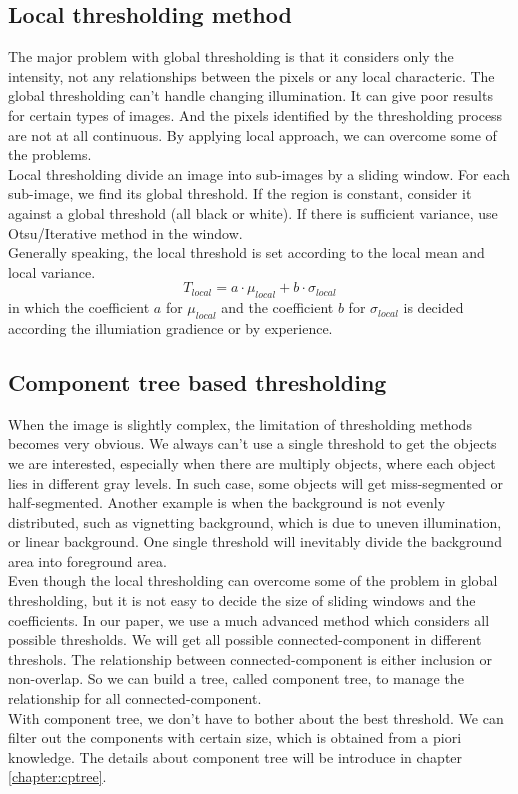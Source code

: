 \subsection{Local thresholding method}
The major problem with global thresholding is that it considers only the intensity, not any relationships between the pixels or any local characteric. The global thresholding can't handle changing illumination. It can give poor results for certain types of images. And the pixels identified by the thresholding process are not at all continuous. By applying local approach, we can overcome some of the problems.\\
Local thresholding divide an image into sub-images by a sliding window. For each sub-image, we find its global threshold. If the region is constant, consider it against a global threshold (all black or white). If there is sufficient variance, use Otsu/Iterative method in the window. \\
Generally speaking, the local threshold is set according to the local mean and local variance.
$$
T_{local} = a\cdot\mu_{local} + b\cdot\sigma_{local}
$$
in which the coefficient $a$ for $\mu_{local}$ and the coefficient $b$ for $\sigma_{local}$ is decided according the illumiation gradience or by experience.
\subsection{Component tree based thresholding}
When the image is slightly complex, the limitation of thresholding methods becomes very obvious. We always can't use a single threshold to get the objects we are interested, especially when there are multiply objects, where each object lies in different gray levels. In such case, some objects will get miss-segmented or half-segmented. Another example is when the background is not evenly distributed, such as vignetting background, which is due to uneven illumination, or linear background. One single threshold will inevitably divide the background area into foreground area.\\
Even though the local thresholding can overcome some of the problem in global thresholding, but it is not easy to decide the size of sliding windows and the coefficients. In our paper, we use a much advanced method which considers all possible thresholds. We will get all possible connected-component in different threshols. The relationship between connected-component is either inclusion or non-overlap. So we can build a tree, called component tree, to manage the relationship for all connected-component. \\
With component tree, we don't have to bother about the best threshold. We can filter out the components with certain size, which is obtained from a piori knowledge. The details about component tree will be introduce in chapter \ref{chapter:cptree}.
